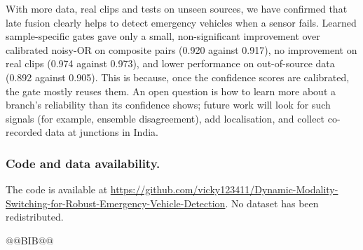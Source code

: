 \documentclass[runningheads,a4paper]{llncs}
\begin{document}
With more data, real clips and tests on unseen sources, we have confirmed that
late fusion clearly helps to detect emergency vehicles when a sensor fails.
Learned sample-specific gates gave only a small, non-significant improvement
over calibrated noisy-OR on composite pairs (0.920 against 0.917), no
improvement on real clips (0.974 against 0.973), and lower performance on
out-of-source data (0.892 against 0.905). This is because, once the confidence
scores are calibrated, the gate mostly reuses them. An open question is how to
learn more about a branch's reliability than its confidence shows; future work will look for such signals (for example, ensemble
disagreement), add localisation, and collect co-recorded data at junctions in
India.

\subsubsection*{Code and data availability.}
The code is available at
\url{https://github.com/vicky123411/Dynamic-Modality-Switching-for-Robust-Emergency-Vehicle-Detection}.
No dataset has been redistributed.


@@BIB@@
\end{document}
